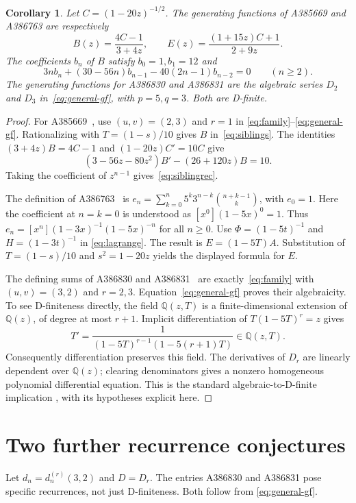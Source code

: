 \documentclass[11pt]{article}
\newtheorem{corollary}[theorem]{Corollary}
\newcommand{\Q}{\mathbb{Q}}
\begin{document}
\begin{corollary}\label{cor:siblings}
Let $C=(1-20z)^{-1/2}$. The generating functions of
A385669 and A386763 are respectively
\begin{equation}\label{eq:siblings}
 B(z)=\frac{4C-1}{3+4z},\qquad
 E(z)=\frac{(1+15z)C+1}{2+9z}.
\end{equation}
The coefficients $b_n$ of $B$ satisfy $b_0=1,b_1=12$ and
\begin{equation}\label{eq:siblingrec}
 3n b_n+(30-56n)b_{n-1}-40(2n-1)b_{n-2}=0
 \qquad(n\geq2).
\end{equation}
The generating functions for A386830 and A386831 are the algebraic
series $D_2$ and $D_3$ in~\eqref{eq:general-gf}, with $p=5,q=3$.
Both are D-finite.
\end{corollary}
\begin{proof}
For A385669~\cite{oeis669}, use $(u,v)=(2,3)$ and $r=1$ in
\eqref{eq:family}--\eqref{eq:general-gf}. Rationalizing with
$T=(1-s)/10$ gives $B$ in~\eqref{eq:siblings}.
The identities $(3+4z)B=4C-1$ and $(1-20z)C'=10C$ give
\[
 (3-56z-80z^2)B'-(26+120z)B=10.
\]
Taking the coefficient of $z^{n-1}$ gives~\eqref{eq:siblingrec}.

The definition of A386763~\cite{oeis763} is
$e_n=\sum_{k=0}^n5^k3^{n-k}\binom{n+k-1}{k}$, with $e_0=1$.
Here the coefficient at $n=k=0$ is understood as
$[x^0](1-5x)^0=1$.
Thus $e_n=[x^n](1-3x)^{-1}(1-5x)^{-n}$ for all $n\geq0$.
Use $\Phi=(1-5t)^{-1}$ and $H=(1-3t)^{-1}$ in
\eqref{eq:lagrange}. The result is $E=(1-5T)A$.
Substitution of $T=(1-s)/10$ and $s^2=1-20z$ yields the displayed
formula for $E$.

The defining sums of A386830 and A386831~\cite{oeis830,oeis831}
are exactly~\eqref{eq:family} with $(u,v)=(3,2)$ and $r=2,3$.
Equation~\eqref{eq:general-gf} proves their algebraicity.
To see D-finiteness directly, the field $\Q(z,T)$ is a finite-dimensional
extension of $\Q(z)$, of degree at most $r+1$. Implicit differentiation
of $T(1-5T)^r=z$ gives
\[
 T'=\frac{1}{(1-5T)^{r-1}(1-5(r+1)T)}\in\Q(z,T).
\]
Consequently differentiation preserves this field. The derivatives
of $D_r$ are linearly dependent over $\Q(z)$; clearing denominators
gives a nonzero homogeneous polynomial differential equation.
This is the standard algebraic-to-D-finite implication
\cite[Theorem 2.1]{stanley}, with its hypotheses explicit here.
\end{proof}

\section{Two further recurrence conjectures}
Let $d_n=d^{(r)}_n(3,2)$ and $D=D_r$. The entries A386830 and A386831
pose specific recurrences, not just D-finiteness. Both follow from
\eqref{eq:general-gf}.
\end{document}
